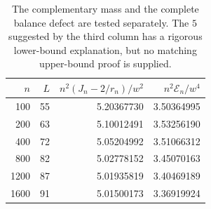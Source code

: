 \begin{table}[htbp]\centering\small\begin{tabular}{rrrr}\toprule
$n$ & $L$ & $n^2(J_n-2/r_n)/w^2$ & $n^2\mathcal E_n/w^4$ \\ \midrule
100 & 55 & 5.20367730 & 3.50364995 \\
200 & 63 & 5.10012491 & 3.53256190 \\
400 & 72 & 5.05204992 & 3.51066312 \\
800 & 82 & 5.02778152 & 3.45070163 \\
1200 & 87 & 5.01935819 & 3.40469189 \\
1600 & 91 & 5.01500173 & 3.36919924 \\
\bottomrule\end{tabular}\caption{The complementary mass and the complete balance defect are tested separately. The $5$ suggested by the third column has a rigorous lower-bound explanation, but no matching upper-bound proof is supplied.}\end{table}
